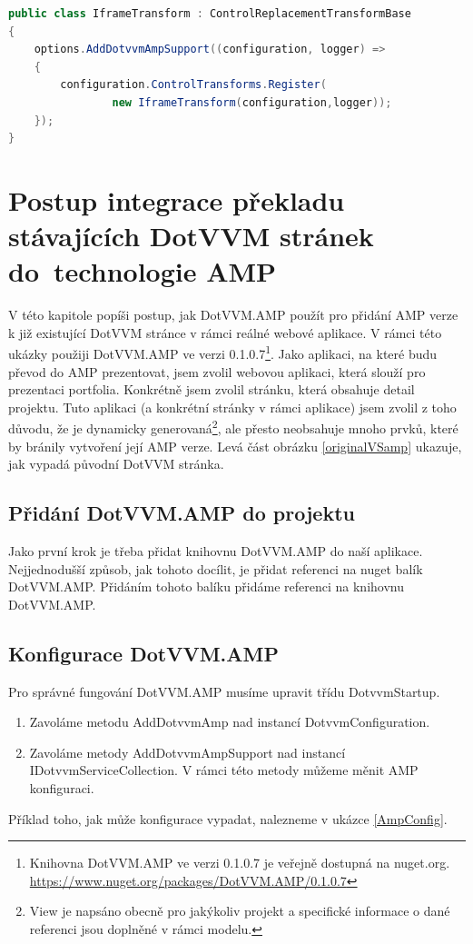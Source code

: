     \begin{lstlisting}[language=c#, caption=Ukazka možné implementace tranformace pro iframe,label=TransformRegistration,captionpos=t]
public class IframeTransform : ControlReplacementTransformBase
{
    options.AddDotvvmAmpSupport((configuration, logger) =>
    {
        configuration.ControlTransforms.Register(
                new IframeTransform(configuration,logger));
    });
}
\end{lstlisting}

\chapter{Postup integrace překladu stávajících DotVVM stránek do~technologie AMP}
V této kapitole popíši postup, jak DotVVM.AMP použít pro přidání AMP verze k již existující DotVVM stránce v rámci reálné webové aplikace. V rámci této ukázky použiji DotVVM.AMP ve verzi 0.1.0.7\footnote{\label{nuget}Knihovna DotVVM.AMP ve verzi 0.1.0.7 je veřejně dostupná na nuget.org.\newline
\url{https://www.nuget.org/packages/DotVVM.AMP/0.1.0.7}}. Jako aplikaci, na které budu převod do AMP prezentovat, jsem zvolil webovou aplikaci, která slouží pro prezentaci portfolia. Konkrétně jsem zvolil stránku, která obsahuje detail projektu. Tuto aplikaci (a konkrétní stránky v rámci aplikace) jsem zvolil z toho důvodu, že je dynamicky generovaná\footnote{View je napsáno obecně pro jakýkoliv projekt a specifické informace o dané referenci jsou doplněné v rámci modelu. }, ale přesto neobsahuje mnoho prvků, které by bránily vytvoření její AMP verze. Levá část obrázku \ref{originalVSamp} ukazuje, jak vypadá původní DotVVM stránka.

\section{Přidání DotVVM.AMP do projektu}
Jako první krok je třeba přidat knihovnu DotVVM.AMP do naší aplikace. Nejjednodušší způsob, jak tohoto docílit, je přidat referenci na nuget balík DotVVM.AMP. Přidáním tohoto balíku přidáme referenci na knihovnu DotVVM.AMP.
\section*{Konfigurace DotVVM.AMP}
Pro správné fungování DotVVM.AMP musíme upravit třídu DotvvmStartup.
\begin{enumerate}
    \item  Zavoláme metodu AddDotvvmAmp nad instancí DotvvmConfiguration.
    \item Zavoláme metody AddDotvvmAmpSupport nad instancí IDotvvmServiceCollection.\newline
    V rámci této metody můžeme měnit AMP konfiguraci.
\end{enumerate}
Příklad toho, jak může konfigurace vypadat, nalezneme v ukázce \ref{AmpConfig}.

